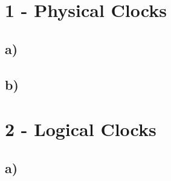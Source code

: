 \documentclass{scrartcl}
\author{Felix Bühler\\2973410 \and Clemens Lieb\\3130838 \and Steffen Wonner\\2862123 \and Fabian Bühler\\2953320}
\title{\gettitle}
\subtitle{\getsubtitle}
\begin{document}
\maketitle

\section*{1 - Physical Clocks}
\subsection*{a)}

\subsection*{b)}

\section*{2 - Logical Clocks}
\subsection*{a)}
\end{document}

